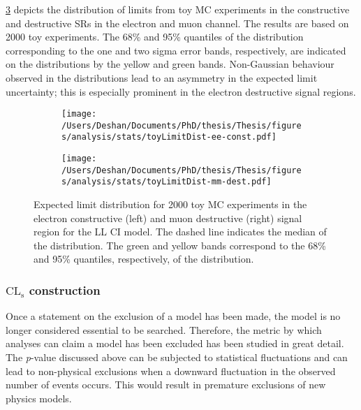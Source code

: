 \cref{fig:toyDist} depicts the distribution of limits from toy MC experiments in the constructive and destructive SRs in the electron and muon channel. The results are based on 2000 toy experiments. The 68\% and 95\% quantiles of the distribution corresponding to the one and two sigma error bands, respectively, are indicated on the distributions by the yellow and green bands. Non-Gaussian behaviour observed in the distributions lead to an asymmetry in the expected limit uncertainty; this is especially prominent in the electron destructive signal regions. 

\begin{figure}[!htpb]
    \centering
    \begin{subfigure}[b]{0.49\textwidth}
        \centering
        \texttt{[image: /Users/Deshan/Documents/PhD/thesis/Thesis/figures/analysis/stats/toyLimitDist-ee-const.pdf]}
        \label{fig:toyDist1}
    \end{subfigure}
    \begin{subfigure}[b]{0.49\textwidth}
        \centering
        \texttt{[image: /Users/Deshan/Documents/PhD/thesis/Thesis/figures/analysis/stats/toyLimitDist-mm-dest.pdf]}
        \label{fig:toyDist2}
    \end{subfigure}
    \caption[Expected limit distribution for 2000 toy MC experiments.]{Expected limit distribution for 2000 toy MC experiments in the electron constructive (left) and muon destructive (right) signal region for the LL CI model. The dashed line indicates the median of the distribution. The green and yellow bands correspond to the 68\% and 95\% quantiles, respectively, of the distribution.}
    \label{fig:toyDist}
\end{figure}

\subsubsection{$\mathrm{CL}_\mathrm{s}$ construction}
Once a statement on the exclusion of a model has been made, the model is no longer considered essential to be searched. Therefore, the metric by which analyses can claim a model has been excluded has been studied in great detail. The \emph{p}-value discussed above can be subjected to statistical fluctuations and can lead to non-physical exclusions when a downward fluctuation in the observed number of events occurs. This would result in premature exclusions of new physics models. 

